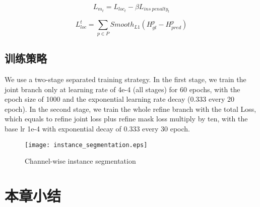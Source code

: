 \begin{equation}
\label{mask_loss}
L_{m_t}=L_{loc_t} - \beta L_{ins\ penalty_t}
\end{equation}

\begin{equation}
\label{mask_loc_loss}
L_{loc}^t =  \sum_{p \in P} Smooth_{L1}( H^{p}_{gt} - H^{p}_{pred} )
\end{equation}

\subsection{训练策略}
\label{subsec:trainingstrategy}
We use a two-stage separated training strategy. In the first stage, we train the joint branch only at learning rate of 4e-4 (all stages) for 60 epochs, with the epoch size of 1000 and the exponential learning rate decay (0.333 every 20 epoch). In the second stage, we train the whole refine branch with the total Loss, which equals to refine joint loss plus refine mask loss multiply by ten, with the base lr 1e-4 with exponential decay of 0.333 every 30 epoch.


\begin{figure}[htbp]
	\centering
	\texttt{[image: instance\_segmentation.eps]}
	\caption{Channel-wise instance segmentation}
	\label{fig:chInsSeg}
\end{figure}

\section{本章小结}
